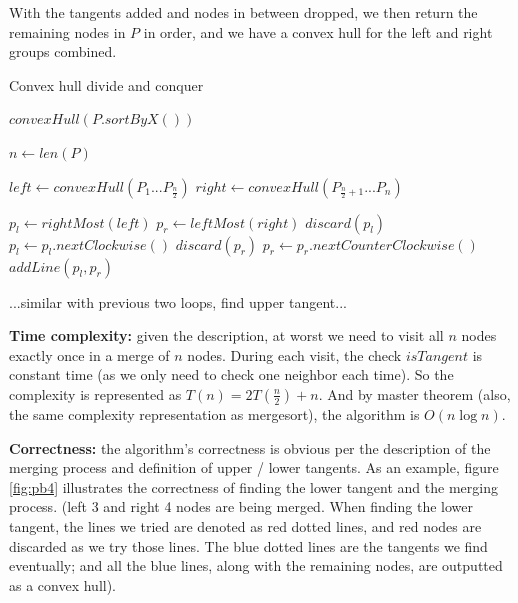 \documentclass{article}
\begin{document}
\begin{description}
  With the tangents added and nodes in between dropped, we then return the remaining nodes in $P$ in order, and we have a convex hull for the left and right groups combined.

  \begin{algorithm}[H]
  \caption{Convex hull divide and conquer}
  \label{alg:convex-hull-divide and conquer}
    \begin{algorithmic}[1]
    
      \State $convexHull(P.sortByX())$
    \EndFunction

      \State $n \gets len(P)$
      \label{line:start1}
        \State {}
      \EndIf
      
      \State $left \gets convexHull(P_1...P_{\frac{n}{2}})$
      \State $right \gets convexHull(P_{\frac{n}{2} + 1}...P_n)$
      \label{line:end1}

      \State $p_l \gets rightMost(left)$
      \label{line:start2}
      \State $p_r \gets leftMost(right)$
        \State $discard(p_l)$
        \State $p_l \gets p_l.nextClockwise()$
      \EndWhile
        \State $discard(p_r)$
        \State $p_r \gets p_r.nextCounterClockwise()$
      \EndWhile
      \State $addLine(p_l, p_r)$ 
      \label{line:end2}

      \State
      \label{line:start3}
      \State ...similar with previous two loops, find upper tangent...
      \EndWhile
      \label{line:end3}
      \State

      \State {}

    \EndFunction

    \end{algorithmic}
  \end{algorithm}

  \textbf{Time complexity:} given the description, at worst we need to visit all $n$ nodes exactly once in a merge of $n$ nodes. During each visit, the check $isTangent$ is constant time (as we only need to check one neighbor each time). So the complexity is represented as $T(n) = 2T(\frac{n}{2}) + n$. And by master theorem (also, the same complexity representation as mergesort), the algorithm is $O(n \log n)$.

  \textbf{Correctness:} the algorithm's correctness is obvious per the description of the merging process and definition of upper / lower tangents. As an example, figure \ref{fig:pb4} illustrates the correctness of finding the lower tangent and the merging process. (left 3 and right 4 nodes are being merged. When finding the lower tangent, the lines we tried are denoted as red dotted lines, and red nodes are discarded as we try those lines. The blue dotted lines are the tangents we find eventually; and all the blue lines, along with the remaining nodes, are outputted as a convex hull).


\end{description}
\end{document}
